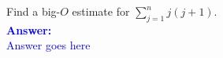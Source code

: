 \item{}
Find a big-$O$ estimate for $\sum_{j=1}^nj(j+1)$.
\\[12pt]
\ifanswers
\textcolor{blue}{
\textbf{Answer:}\\[6pt]
Answer goes here
}
\newpage
\fi
